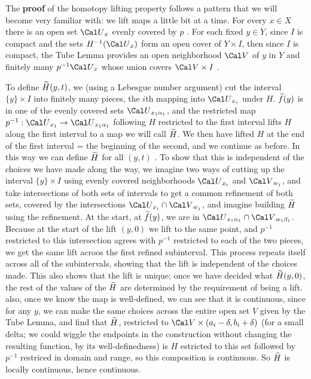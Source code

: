 \bsk


The {\bf proof} of the homotopy lifting property follows a pattern 
that we will become 
very familiar with: we lift maps a little bit at a time. For every $x\in X$
there is an open set ${\Cal U}_x$ evenly covered by $p$ . For each fixed
$y\in Y$, since $I$ is compact and the sets $H^{-1}({\Cal U}_x)$ form an
open cover of $Y\times I$, then since $I$ is compact, 
the Tube Lemma provides an open neighborhood 
${\Cal V}$ of $y$ in $Y$ and finitely many $p^{-1}{\Cal U}_{x}$ whose union
covers ${\Cal V}\times I$ . 

\msk

To define $\widetilde{H}(y,t)$, we (using a Lebesgue number argument) cut the
interval $\{y\}\times I$ into finitely many pieces, the $i$th mapping into 
 ${\Cal U}_{x_i}$ under $H$. $\widetilde{f}(y)$ is in one of the evenly covered
sets ${\Cal U}_{x_1\alpha_1}$, and the restricted map 
$p^{-1}:{\Cal U}_{x_1}\ra {\Cal U}_{x_1\alpha_1}$ following $H$ restricted
to the first interval lifts $H$ along the first interval to a map 
we will call $\widetilde{H}$. We then have 
lifted $H$ at the end of the first interval = the beginning of the second, 
and we continue as before. In this way we can define $\widetilde{H}$ for all
$(y,t)$ . To show that this is independent of the choices we have
made along the way, we imagine two ways of cutting up the interval 
$\{y\}\times I$ using evenly covered neighborhoods ${\Cal U}_{x_i}$
and ${\Cal V}_{w_j}$, and take intersections of both sets of intervals
to get a common refinement of both sets, covered by the intersections
${\Cal U}_{x_i}\cap {\Cal V}_{w_j}$, and imagine building $\widetilde{H}$ using
the refinement. At the start, at $\widetilde{f}(y)$, we are in 
${\Cal U}_{x_1\alpha_1}\cap {\Cal V}_{w_1\beta_1}$. Because at the 
start of the lift $(y,0)$ we lift to the same point, and $p^{-1}$ restricted 
to this intersection agrees with $p^{-1}$ restricted to each of the two
pieces, we get the same lift acroos the first refined subinterval. This
process repeats itself across all of the subintervals, showing that
the lift is independent of the choices made. This also shows that
the lift is unique; once we have decided what $\widetilde{H}(y,0)$, the
rest of the values of the $\widetilde{H}$ are determined by the requirement
of being a lift. also, once we know the map is well-defined, we can see
that it is continuous, since for any $y$, we can make the same choices
across the entire open set $V$ given by the Tube Lemma, and find
that $\widetilde{H}$, restricted to ${\Cal V}\times(a_i-\delta,b_i+\delta)$
(for a small delta; we could wiggle the endpoints in the construction
without changing the resulting function, by its well-definedness)
is $H$ estricted to this set followed by $p^{-1}$ restriced in domain 
and range, so this composition is continuous. So $\widetilde{H}$
is locally continuous, hence continuous.

